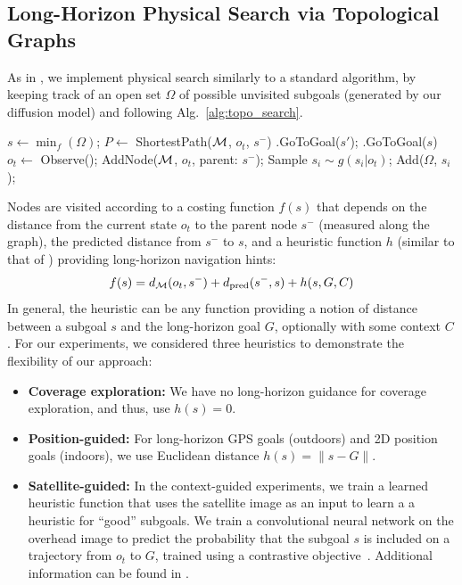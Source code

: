 \subsection{Long-Horizon Physical Search via Topological Graphs}
\label{sec:app:implementation_graph}

As in \citet{shah2022viking}, we implement physical search similarly to a standard \Astar algorithm, by keeping track of an open set $\Omega$ of possible unvisited subgoals (generated by our diffusion model) and following Alg.~\ref{alg:topo_search}.

\begin{algorithm}
\caption{Long-Horizon Navigation via Topological Graph}\label{alg:topo_search}
\begin{algorithmic}[1]
    \STATE $s \gets \min_f(\Omega)$;
    \STATE $P \gets$ ShortestPath(${\mathcal{M}}$, $o_t$, $s^-$)
        \STATE \ModelName.GoToGoal($s'$);
    \ENDFOR
    \STATE \ModelName.GoToGoal($s$)
    \STATE $o_t \gets$ Observe();
    \STATE AddNode(${\mathcal{M}}$, $o_t$, parent: $s^-$);
    \STATE Sample $s_i \sim g(s_i|o_t)$;
    \STATE Add($\Omega$, $s_i$);
\ENDWHILE
\end{algorithmic}
\end{algorithm}

Nodes are visited according to a costing function $f(s)$ that depends on the distance from the current state $o_t$ to the parent node $s^-$ (measured along the graph), the predicted distance from $s^-$ to $s$, and a heuristic function $h$ (similar to that of \Astar) providing long-horizon navigation hints:
\[f(s) = d_{\mathcal{M}}(o_t, s^-) + d_\text{pred}(s^-, s) + h(s, G, C)\]
In general, the heuristic can be any function providing a notion of distance between a subgoal $s$ and the long-horizon goal $G$, optionally with some context $C$. For our experiments, we considered three heuristics to demonstrate the flexibility of our approach:
\begin{itemize}
    \item \textbf{Coverage exploration:} We have no long-horizon guidance for coverage exploration, and thus, use $h(s) = 0$.
    \item \textbf{Position-guided:} For long-horizon GPS goals (outdoors) and 2D position goals (indoors), we use Euclidean distance $h(s) = \lVert s - G \rVert$.
    \item \textbf{Satellite-guided:} In the context-guided experiments, we train a learned heuristic function that uses the satellite image as an input to learn a a heuristic for ``good'' subgoals. We train a convolutional neural network on the overhead image to predict the probability that the subgoal $s$ is included on a trajectory from $o_t$ to $G$, trained using a contrastive objective~\cite{oord2019representation}. Additional information can be found in \citet{shah2022viking}.
\end{itemize}


